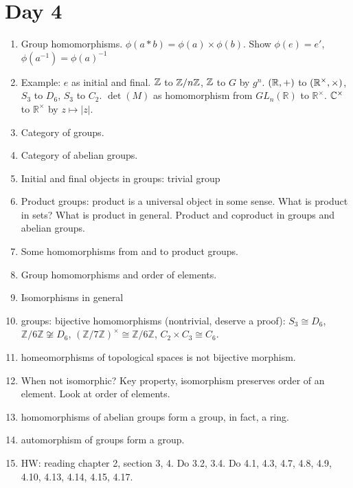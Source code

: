 \documentclass[12pt]{scrartcl}
\newcommand{\R}{\mathbb{R}}
\newcommand{\Z}{\mathbb{Z}}
\begin{document}
\section{Day 4}
\begin{enumerate}
    \item Group homomorphisms. $\phi(a*b) = \phi(a)\times \phi(b)$. Show $\phi(e)=e'$, $\phi(a^{-1})=\phi(a)^{-1}$ 
    \item Example: $e$ as initial and final. $\mathbb Z$ to $\mathbb Z/n\mathbb Z$, $\mathbb Z$ to $G$ by $g^n$. $(\mathbb R,+)$ to $(\mathbb R^\times, \times)$, $S_3$ to $D_6$, $S_3$ to $C_2$. $\det(M)$ as homomorphism from $GL_n(\R)$ to $\R^\times$. $\mathbb C^\times$ to $\R^\times$ by $z\mapsto |z|$. 
    \item Category of groups. 
    \item Category of abelian groups. 
    \item Initial and final objects in groups: trivial group
    \item Product groups: product is a universal object in some sense. What is product in sets? What is product in general. Product and coproduct in groups and abelian groups. 
    \item Some homomorphisms from and to product groups.
    \item Group homomorphisms and order of elements. 
    \item Isomorphisms in general
    \item groups: bijective homomorphisms (nontrivial, deserve a proof): $S_3\cong D_6$, $\Z/6\Z \not\cong D_6$, $(\Z/7\Z)^\times \cong \Z/6\Z$, $C_2\times C_3 \cong C_6$. 
    \item homeomorphisms of topological spaces is not bijective morphism. 
    \item When not isomorphic? Key property, isomorphism preserves order of an element. Look at order of elements.
    \item homomorphisms of abelian groups form a group, in fact, a ring. 
    \item automorphism of groups form a group.
    \item HW: reading chapter 2,  section 3, 4. Do 3.2, 3.4. Do 4.1, 4.3, 4.7, 4.8, 4.9, 4.10, 4.13, 4.14, 4.15, 4.17. 
\end{enumerate}
\end{document}
